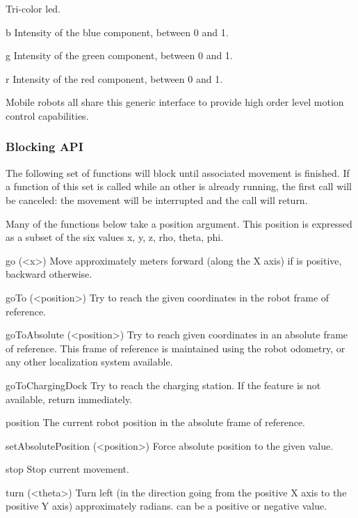 Tri-color led.

\begin{urbiscriptapi}
\item[b] Intensity of the blue component, between 0 and 1.


\item[g] Intensity of the green component, between 0 and 1.


\item[r] Intensity of the red component, between 0 and 1.
\end{urbiscriptapi}





Mobile robots all share this generic interface to provide high order
level motion control capabilities.

\subsubsection{Blocking API}

The following set of functions will block until associated movement is
finished.  If a function of this set is called while an other is already
running, the first call will be canceled: the movement will be interrupted
and the call will return.

Many of the functions below take a position argument. This position is
expressed as a subset of the six values x, y, z, rho, theta, phi.

\begin{urbiscriptapi}
\item[go](<x>) Move approximately  meters forward (along the X axis)
  if  is positive, backward otherwise.


\item[goTo](<position>) Try to reach the given coordinates in the robot
  frame of reference.


\item[goToAbsolute](<position>) Try to reach given coordinates in an
  absolute frame of reference. This frame of reference is maintained using
  the robot odometry, or any other localization system available.


\item[goToChargingDock] Try to reach the charging station. If the feature is
  not available, return immediately.


\item[position] The current robot position in the absolute frame of
  reference.


\item[setAbsolutePosition](<position>) Force absolute position to the given
  value.


\item[stop] Stop current movement.


\item[turn](<theta>) Turn left (in the direction going from the positive X
  axis to the positive Y axis) approximately  radians.
   can be a positive or negative value.
\end{urbiscriptapi}

